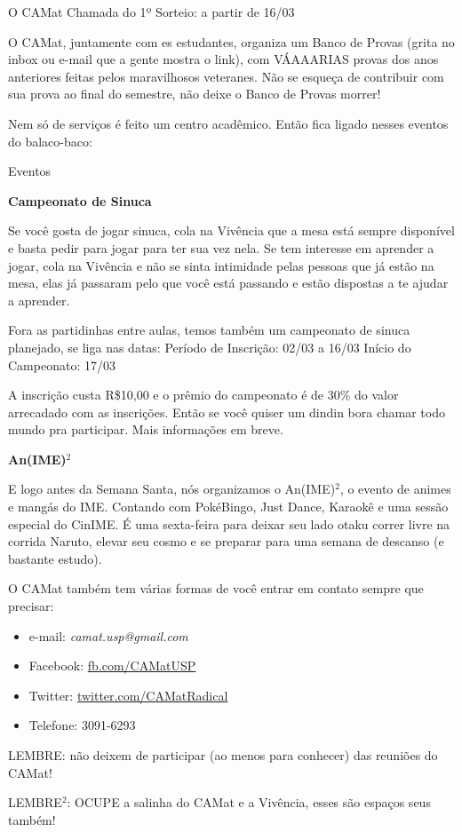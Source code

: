 \begin{secao}{O CAMat}
Chamada do 1º Sorteio: a partir de 16/03

O CAMat, juntamente com es estudantes, organiza um Banco de Provas (grita no inbox ou e-mail que a gente mostra o link), com VÁAAARIAS provas dos anos anteriores feitas pelos maravilhosos veteranes. Não se esqueça de contribuir com sua prova ao final do semestre, não deixe o Banco de Provas morrer!
  
Nem só de serviços é feito um centro acadêmico. Então fica ligado nesses eventos do balaco-baco:

\begin{subsecao}{Eventos}

\textbf{Campeonato de Sinuca}

Se você gosta de jogar sinuca, cola na Vivência que a mesa está sempre disponível e basta pedir para jogar para ter sua vez nela. Se tem interesse em aprender a jogar, cola na Vivência e não se sinta intimidade pelas pessoas que já estão na mesa, elas já passaram pelo que você está passando e estão dispostas a te ajudar a aprender.

Fora as partidinhas entre aulas, temos também um campeonato de sinuca planejado, se liga nas datas: 
Período de Inscrição: 02/03 a 16/03
Início do Campeonato: 17/03

A inscrição custa R\$10,00 e o prêmio do campeonato é de 30\% do valor arrecadado com as inscrições. Então se você quiser um dindin bora chamar todo mundo pra participar. Mais informações em breve.


\textbf{An(IME)$^2$}

E logo antes da Semana Santa, nós organizamos o An(IME)$^2$, 
o evento de animes e mangás do IME. Contando 
com PokéBingo, Just Dance, Karaokê e uma sessão especial do CinIME. É uma sexta-feira para deixar seu lado otaku correr livre na corrida Naruto, elevar seu cosmo e se preparar para uma semana de descanso (e bastante estudo).


O CAMat também tem várias formas de você entrar em contato sempre que precisar:

\begin{itemize}
\item e-mail: \textit{camat.usp@gmail.com}
\item Facebook: \url{fb.com/CAMatUSP}
\item Twitter: \url{twitter.com/CAMatRadical}
\item Telefone: 3091-6293
\end{itemize}
LEMBRE: não deixem de participar (ao menos para conhecer) das reuniões do
CAMat!

LEMBRE$^2$: OCUPE a salinha do CAMat e a Vivência, esses são espaços seus também!

\end{subsecao}

\end{secao}
